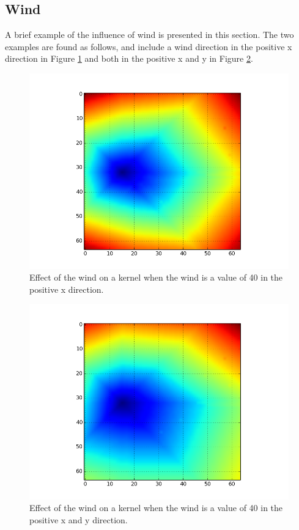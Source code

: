 \subsection*{Wind}\label{sec:wind}
A brief example of the influence of wind is presented in this section. The two examples are found as follows, and include a wind direction in the positive x direction in Figure \ref{fig:wind} and both in the positive x and y in Figure \ref{fig:wind_both}. 
\begin{figure}[H]
\centering
  \includegraphics[height=.4\textheight]{figures/results/40_wind.png}
  \caption{Effect of the wind on a kernel when the wind is a value of 40 in the positive x direction.}
  \label{fig:wind}
\end{figure}  
\begin{figure}[H]
\centering
  \includegraphics[height=.4\textheight]{figures/results/40_40_wind.png}
  \caption{Effect of the wind on a kernel when the wind is a value of 40 in the positive x and y direction.}
  \label{fig:wind_both}
\end{figure} 

